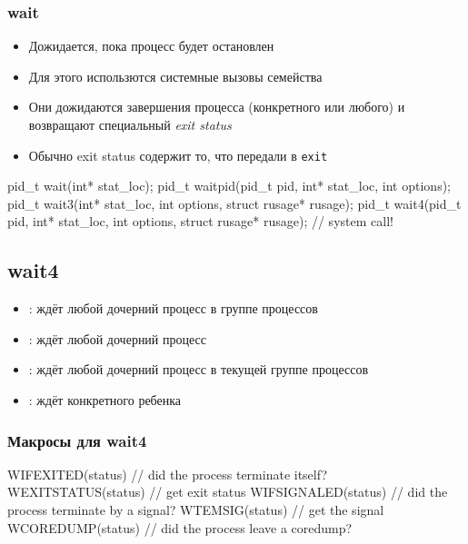   \subsubsection{wait}
    \begin{itemize}
      \item Дожидается, пока процесс будет остановлен
      \item Для этого использются системные вызовы семейства 
      \item Они дожидаются завершения процесса (конкретного или любого) и возвращают специальный \textit{exit status}
      \item Обычно exit status содержит то, что передали в \texttt{exit}
    \end{itemize}

\begin{cminted}
pid_t wait(int* stat_loc);
pid_t waitpid(pid_t pid, int* stat_loc, int options);
pid_t wait3(int* stat_loc, int options, struct rusage* rusage);
pid_t wait4(pid_t pid, int* stat_loc, int options,
            struct rusage* rusage);  // system call!
\end{cminted}

  \subsection{wait4}
    \begin{itemize}
      \item {}: ждёт любой дочерний процесс в группе процессов 
      \item {}: ждёт любой дочерний процесс
      \item {}: ждёт любой дочерний процесс в текущей группе процессов
      \item {}: ждёт конкретного ребенка
    \end{itemize}
  
  \subsubsection{Макросы для wait4}
\begin{cminted}
WIFEXITED(status)  // did the process terminate itself?
WEXITSTATUS(status)  // get exit status
WIFSIGNALED(status)  // did the process terminate by a signal?
WTEMSIG(status)  // get the signal
WCOREDUMP(status)  // did the process leave a coredump?
\end{cminted}

